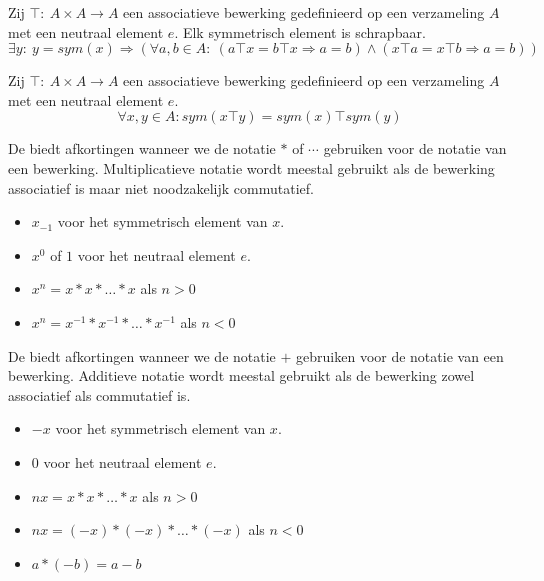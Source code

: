 \documentclass[main.tex]{subfiles}
\begin{document}
\begin{st}
  Zij $\top:\ A\times A\rightarrow A$ een associatieve bewerking gedefinieerd op een verzameling $A$ met een neutraal element $e$.
  Elk symmetrisch element is schrapbaar.
  \[ \exists y:\ y = sym(x) \Rightarrow (\forall a,b \in A:\ (a\top x = b \top x \Rightarrow a = b) \wedge( x\top a = x \top b \Rightarrow a = b)) \]

\end{st}

\begin{st}
  Zij $\top:\ A\times A\rightarrow A$ een associatieve bewerking gedefinieerd op een verzameling $A$ met een neutraal element $e$.
  \[ \forall x, y \in A: sym(x\top y) = sym(x) \top sym(y) \]

\end{st}


\begin{de}
  \label{multiplicatieve-notatie}
  De  biedt afkortingen wanneer we de notatie $*$ of $\cdots$ gebruiken voor de notatie van een bewerking.
  Multiplicatieve notatie wordt meestal gebruikt als de bewerking associatief is maar niet noodzakelijk commutatief.
  \begin{itemize}
  \item $x_{-1}$ voor het symmetrisch element van $x$.
  \item $x^{0}$ of $1$ voor het neutraal element $e$.
  \item $x^{n} = x * x * \dotsc * x$ als $n > 0$
  \item $x^{n} = x^{-1} * x^{-1} * \dotsc * x^{-1}$ als $n < 0$
  \end{itemize}
\end{de}

\begin{de}
  \label{additieve-notatie}
  De  biedt afkortingen wanneer we de notatie $+$ gebruiken voor de notatie van een bewerking.
  Additieve notatie wordt meestal gebruikt als de bewerking zowel associatief als commutatief is.
  \begin{itemize}
  \item $-x$ voor het symmetrisch element van $x$.
  \item $0$ voor het neutraal element $e$.
  \item $nx = x * x * \dotsc * x$ als $n > 0$
  \item $nx = (-x) * (-x) * \dotsc * (-x)$ als $n < 0$
  \item $a * (-b) = a-b$
  \end{itemize}
\end{de}
\end{document}
